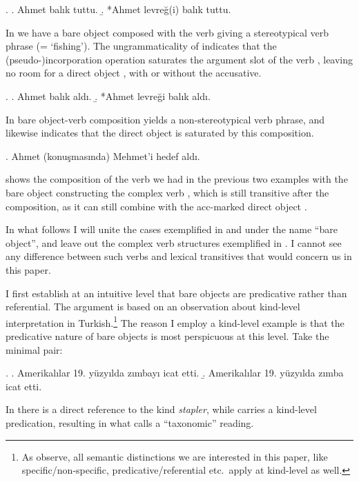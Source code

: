\documentclass[11pt,a4paper]{article}
\begin{document}
\ex.
\label{exbalik1}
\a. Ahmet balık tuttu.
\b. *Ahmet levreğ(i) balık tuttu.

In  we have a bare object composed with the verb giving a
stereotypical verb phrase (= `fishing'). The ungrammaticality of
 indicates that the (pseudo-)incorporation operation
saturates the argument slot of the verb , leaving no room for
a direct object , with or without the
accusative.

\ex.\label{exbalik2} 
\a.
Ahmet balık aldı.
\b.
*Ahmet levreği balık aldı.

In  bare object-verb composition yields a non-stereotypical
verb phrase, and  likewise indicates that the direct object
is saturated by this composition.

\ex.
\label{exbalik3}
Ahmet (konuşmasında) Mehmet'i hedef aldı.

 shows the composition of the verb we had in the previous two
examples with the bare object  constructing the complex
verb , which is still transitive after the composition,
as it can still combine with the acc-marked direct object
.

In what follows I will unite the cases exemplified in  and
 under the name ``bare object'', and leave out the complex verb
structures exemplified in . I cannot see any difference between
such verbs and lexical transitives that would concern us in this paper.

I first establish at an intuitive level that bare objects are predicative
rather than referential. The argument is based on an observation about
kind-level interpretation in Turkish.\footnote{As 
observe, all semantic distinctions we are interested in this paper, like
specific/non-specific, predicative/referential etc.\ apply at kind-level as
well.} The reason I employ a kind-level example is that the predicative nature
of bare objects is most perspicuous at this level. Take the minimal pair:

\ex.\label{exzimba}
\a. Amerikalılar 19. yüzyılda  zımbayı icat etti.
\b. Amerikalılar 19. yüzyılda zımba icat etti.

In  there is a direct reference to the kind \emph{stapler}, while  carries a kind-level predication, resulting in what  calls a ``taxonomic'' reading.
\end{document}
